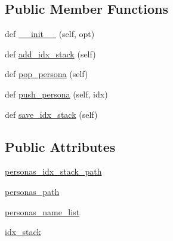 \subsection*{Public Member Functions}
\begin{DoxyCompactItemize}
\item 
def \hyperlink{classparlai_1_1mturk_1_1tasks_1_1convai2__model__eval_1_1worlds_1_1PersonasGenerator_aa0c6c8bdbf1e305073a4d9a32ac8dbe9}{\+\_\+\+\_\+init\+\_\+\+\_\+} (self, opt)
\item 
def \hyperlink{classparlai_1_1mturk_1_1tasks_1_1convai2__model__eval_1_1worlds_1_1PersonasGenerator_aa6d41d88d84d5db2a35a759e137da157}{add\+\_\+idx\+\_\+stack} (self)
\item 
def \hyperlink{classparlai_1_1mturk_1_1tasks_1_1convai2__model__eval_1_1worlds_1_1PersonasGenerator_aaed4bad803d218c5a11ffabae4fd4e66}{pop\+\_\+persona} (self)
\item 
def \hyperlink{classparlai_1_1mturk_1_1tasks_1_1convai2__model__eval_1_1worlds_1_1PersonasGenerator_a56726b1b104cbb5ab96a545fd64a917f}{push\+\_\+persona} (self, idx)
\item 
def \hyperlink{classparlai_1_1mturk_1_1tasks_1_1convai2__model__eval_1_1worlds_1_1PersonasGenerator_a73147a14066f719d65b627877cfa13f6}{save\+\_\+idx\+\_\+stack} (self)
\end{DoxyCompactItemize}
\subsection*{Public Attributes}
\begin{DoxyCompactItemize}
\item 
\hyperlink{classparlai_1_1mturk_1_1tasks_1_1convai2__model__eval_1_1worlds_1_1PersonasGenerator_a4d234fa06082edf35bb1554c1d52455b}{personas\+\_\+idx\+\_\+stack\+\_\+path}
\item 
\hyperlink{classparlai_1_1mturk_1_1tasks_1_1convai2__model__eval_1_1worlds_1_1PersonasGenerator_a3a1aee155f1499e76aeb9a3907a8ebf6}{personas\+\_\+path}
\item 
\hyperlink{classparlai_1_1mturk_1_1tasks_1_1convai2__model__eval_1_1worlds_1_1PersonasGenerator_ae6ffe35afe3d6d65219a048937249969}{personas\+\_\+name\+\_\+list}
\item 
\hyperlink{classparlai_1_1mturk_1_1tasks_1_1convai2__model__eval_1_1worlds_1_1PersonasGenerator_a09df2c36e5bfd5ece1815ae8e804fe03}{idx\+\_\+stack}
\end{DoxyCompactItemize}


